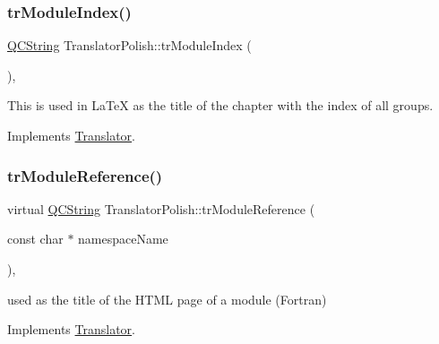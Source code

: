 \mbox{\label{class_translator_polish_a6b8bc70d985ec1f4bdf38a23f95707e0}} 
\subsubsection{\texorpdfstring{trModuleIndex()}{trModuleIndex()}}
{\footnotesize\ttfamily \mbox{\hyperlink{class_q_c_string}{Q\+C\+String}} Translator\+Polish\+::tr\+Module\+Index (\begin{DoxyParamCaption}{ }\end{DoxyParamCaption})\hspace{0.3cm}{\ttfamily [inline]}, {\ttfamily [virtual]}}

This is used in La\+TeX as the title of the chapter with the index of all groups. 

Implements \mbox{\hyperlink{class_translator}{Translator}}.

\mbox{\label{class_translator_polish_a42dcfc97bef0cd7d9b17fdbc34a6bf0d}} 
\subsubsection{\texorpdfstring{trModuleReference()}{trModuleReference()}}
{\footnotesize\ttfamily virtual \mbox{\hyperlink{class_q_c_string}{Q\+C\+String}} Translator\+Polish\+::tr\+Module\+Reference (\begin{DoxyParamCaption}\item[{const char $\ast$}]{namespace\+Name }\end{DoxyParamCaption})\hspace{0.3cm}{\ttfamily [inline]}, {\ttfamily [virtual]}}

used as the title of the H\+T\+ML page of a module (Fortran) 

Implements \mbox{\hyperlink{class_translator}{Translator}}.

\mbox{\label{class_translator_polish_a8119325d06437d3a3b76a0b4546927fc}} 

